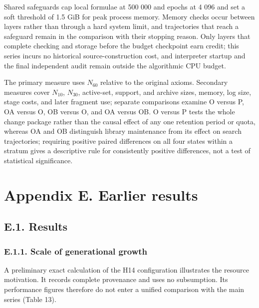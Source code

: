 \documentclass[pdflatex,sn-basic,Numbered]{sn-jnl}
\begin{document}
Shared safeguards cap local formulae at 500 000 and epochs at 4 096 and set a soft threshold of 1.5 GiB for peak process memory. Memory checks occur between layers rather than through a hard system limit, and trajectories that reach a safeguard remain in the comparison with their stopping reason. Only layers that complete checking and storage before the budget checkpoint earn credit; this series incurs no historical source-construction cost, and interpreter startup and the final independent audit remain outside the algorithmic CPU budget.

The primary measure uses \(N_{60}\) relative to the original axioms. Secondary measures cover \(N_{10}\), \(N_{30}\), active-set, support, and archive sizes, memory, log size, stage costs, and later fragment use; separate comparisons examine O versus P, OA versus O, OB versus O, and OA versus OB. O versus P tests the whole change package rather than the causal effect of any one retention period or quota, whereas OA and OB distinguish library maintenance from its effect on search trajectories; requiring positive paired differences on all four states within a stratum gives a descriptive rule for consistently positive differences, not a test of statistical significance.

\section*{Appendix E. Earlier results}\label{appendix-e.-earlier-results}

\subsection*{E.1. Results}\label{e.1.-results}

\subsubsection*{E.1.1. Scale of generational growth}\label{e.1.1.-scale-of-generational-growth}

A preliminary exact calculation of the H14 configuration illustrates the resource motivation. It records complete provenance and uses no subsumption. Its performance figures therefore do not enter a unified comparison with the main series (Table 13).

\begingroup
\small
\setlength{\tabcolsep}{3pt}
\renewcommand{\arraystretch}{1.13}
\end{document}
